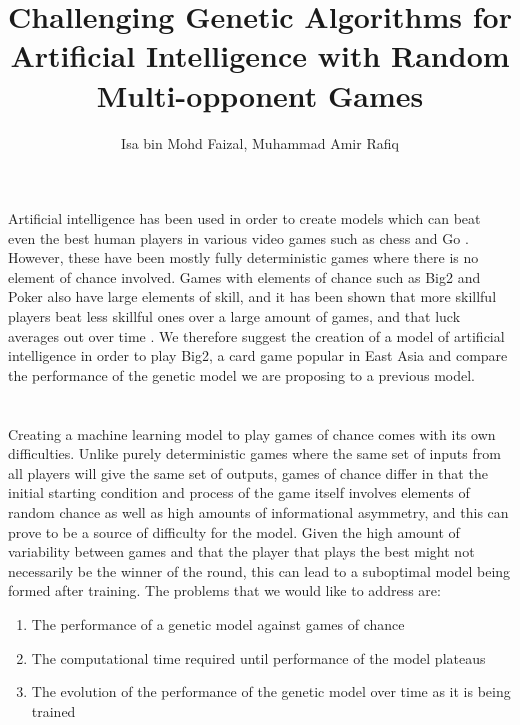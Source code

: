 \documentclass[]{article}
\title{Challenging Genetic Algorithms for Artificial Intelligence with Random Multi-opponent Games }
\author{Isa bin Mohd Faizal, Muhammad Amir Rafiq}
\begin{document}
	
	\maketitle
	
	\section*{}
	
	\section*{}
	Artificial intelligence has been used in order to create models which can beat even the best human players in various video games such as chess and Go \cite{chessai} \cite{goai}. However, these have been mostly fully deterministic games where there is no element of chance involved. Games with elements of chance such as Big2 and Poker also have large elements of skill, and it has been shown that more skillful players beat less skillful ones over a large amount of games, and that luck averages out over time \cite{pokerluck}. We therefore suggest the creation of a model of artificial intelligence in order to play Big2, a card game popular in East Asia and compare the performance of the genetic model we are proposing to a previous model.
	
	\section*{}
	
	Creating a machine learning model to play games of chance comes with its own difficulties. Unlike purely deterministic games where the same set of inputs from all players will give the same set of outputs, games of chance differ in that the initial starting condition and process of the game itself involves elements of random chance as well as high amounts of informational asymmetry, and this can prove to be a source of difficulty for the model. \cite{pokerai} Given the high amount of variability between games and that the player that plays the best might not necessarily be the winner of the round, this can lead to a suboptimal model being formed after training. The problems that we would like to address are:
	
	\begin{enumerate}
		\item The performance of a genetic model against games of chance
		\item The computational time required until performance of the model plateaus
		\item The evolution of the performance of the genetic model over time as it is being trained
	\end{enumerate}
	
\end{document}
